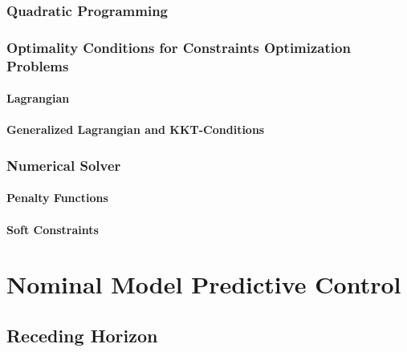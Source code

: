         \subsection{Quadratic Programming} %

        \subsection{Optimality Conditions for Constraints Optimization Problems} %

            \subsubsection{Lagrangian} %

            \subsubsection{Generalized Lagrangian and KKT-Conditions} %

        \subsection{Numerical Solver} %

            \subsubsection{Penalty Functions} %

            \subsubsection{Soft Constraints} %

\chapter{Nominal Model Predictive Control} %

    \section{Receding Horizon} %

